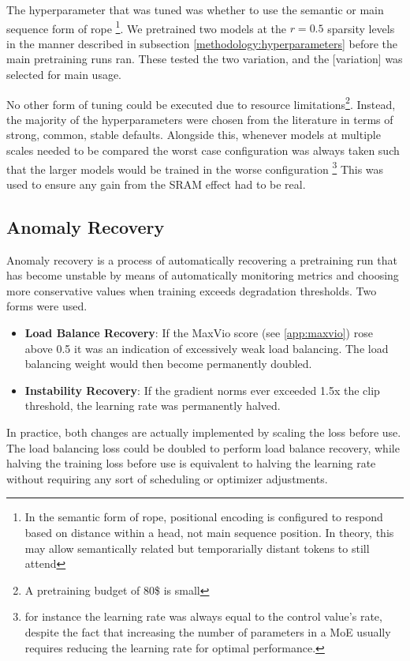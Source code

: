 \documentclass[11pt]{article}
\begin{document}
The  hyperparameter that was tuned was whether to use the semantic or main sequence form of rope \footnote{In the semantic form of rope, positional encoding is configured to respond based on distance within a head, not main sequence position. In theory, this may allow semantically related but temporarially distant tokens to still attend}. We pretrained two models at the $r=0.5$ sparsity levels in the manner described in subsection \ref{methodology:hyperparameters} before the main pretraining runs ran. These tested the two variation, and the [variation] was selected for main usage.

No other form of tuning could be executed due to resource limitations\footnote{A pretraining budget of 80\$ is small}. Instead, the majority of the hyperparameters were chosen from the literature in terms of strong, common, stable defaults. Alongside this, whenever models at multiple scales needed to be compared the worst case configuration was always taken such that the larger models would be trained in the worse configuration \footnote{for instance the learning rate was always equal to the control value's rate, despite the fact that increasing the number of parameters in a MoE usually requires reducing the learning rate for optimal performance.} This was used to ensure any gain from the SRAM effect had to be real.


\subsection{Anomaly Recovery}
\label{app:anomaly_recovery}

Anomaly recovery is a process of automatically recovering a pretraining run that has become unstable by means of automatically monitoring metrics and choosing more conservative values when training exceeds degradation thresholds. Two forms were used.

\begin{itemize}
    \item \textbf{Load Balance Recovery}: If the MaxVio score (see \ref{app:maxvio}) rose above 0.5 it was an indication of excessively weak load balancing. The load balancing weight would then become permanently doubled.
    \item \textbf{Instability Recovery}: If the gradient norms ever exceeded 1.5x the clip threshold, the learning rate was permanently halved.
\end{itemize}

In practice, both changes are actually implemented by scaling the loss before use. The load balancing loss could be doubled to perform load balance recovery, while halving the training loss before use is equivalent to halving the learning rate without requiring any sort of scheduling or optimizer adjustments.
\end{document}
